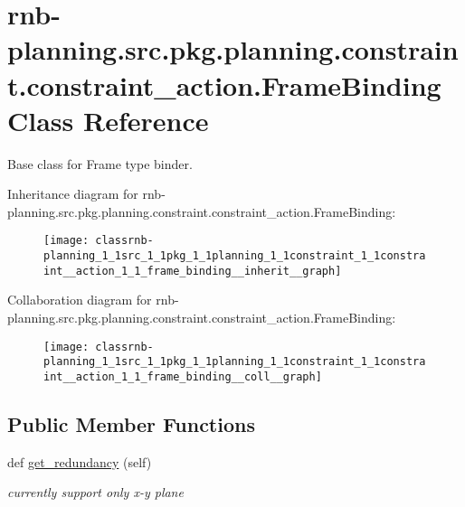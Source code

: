 \hypertarget{classrnb-planning_1_1src_1_1pkg_1_1planning_1_1constraint_1_1constraint__action_1_1_frame_binding}{}\section{rnb-\/planning.src.\+pkg.\+planning.\+constraint.\+constraint\+\_\+action.\+Frame\+Binding Class Reference}
\label{classrnb-planning_1_1src_1_1pkg_1_1planning_1_1constraint_1_1constraint__action_1_1_frame_binding}


Base class for Frame type binder.  




Inheritance diagram for rnb-\/planning.src.\+pkg.\+planning.\+constraint.\+constraint\+\_\+action.\+Frame\+Binding\+:
\nopagebreak
\begin{figure}[H]
\begin{center}
\leavevmode
\texttt{[image: classrnb-planning\_1\_1src\_1\_1pkg\_1\_1planning\_1\_1constraint\_1\_1constraint\_\_action\_1\_1\_frame\_binding\_\_inherit\_\_graph]}
\end{center}
\end{figure}


Collaboration diagram for rnb-\/planning.src.\+pkg.\+planning.\+constraint.\+constraint\+\_\+action.\+Frame\+Binding\+:
\nopagebreak
\begin{figure}[H]
\begin{center}
\leavevmode
\texttt{[image: classrnb-planning\_1\_1src\_1\_1pkg\_1\_1planning\_1\_1constraint\_1\_1constraint\_\_action\_1\_1\_frame\_binding\_\_coll\_\_graph]}
\end{center}
\end{figure}
\subsection*{Public Member Functions}
\begin{DoxyCompactItemize}
\item 
\mbox{\label{classrnb-planning_1_1src_1_1pkg_1_1planning_1_1constraint_1_1constraint__action_1_1_frame_binding_abf3305a0de1206ad53f941b6b65407ad}} 
def \hyperlink{classrnb-planning_1_1src_1_1pkg_1_1planning_1_1constraint_1_1constraint__action_1_1_frame_binding_abf3305a0de1206ad53f941b6b65407ad}{get\+\_\+redundancy} (self)
\begin{DoxyCompactList}\small\item\em currently support only x-\/y plane \end{DoxyCompactList}\end{DoxyCompactItemize}
